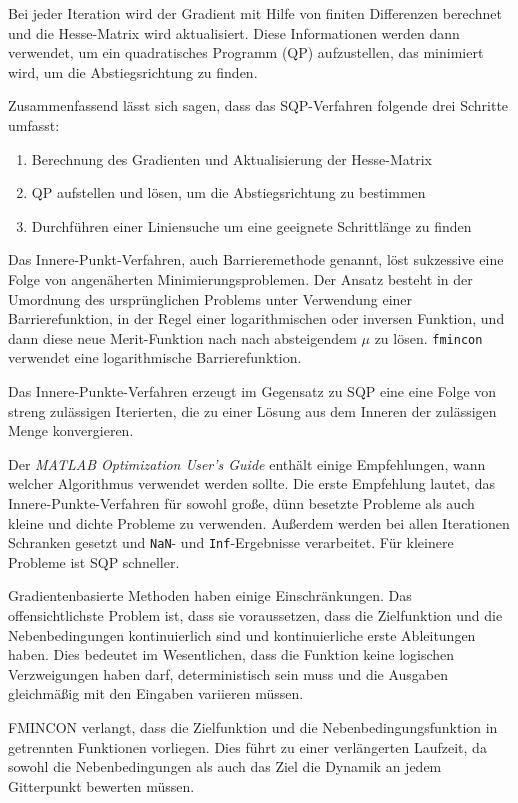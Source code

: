 Bei jeder Iteration wird der Gradient mit Hilfe von finiten Differenzen berechnet und die Hesse-Matrix wird aktualisiert. Diese Informationen werden dann verwendet, um ein quadratisches Programm (QP) aufzustellen, das minimiert wird, um die Abstiegsrichtung zu finden.

Zusammenfassend lässt sich sagen, dass das SQP-Verfahren folgende drei Schritte umfasst:
\begin{enumerate}
    \item Berechnung des Gradienten und Aktualisierung der Hesse-Matrix
    \item QP aufstellen und lösen, um die Abstiegsrichtung zu bestimmen
    \item Durchführen einer Liniensuche um eine geeignete Schrittlänge zu finden
\end{enumerate}

Das Innere-Punkt-Verfahren, auch Barrieremethode genannt, löst sukzessive eine Folge von angenäherten Minimierungsproblemen. Der Ansatz besteht in der Umordnung des ursprünglichen Problems unter Verwendung einer Barrierefunktion, in der Regel einer logarithmischen oder inversen Funktion, und dann diese neue Merit-Funktion nach nach absteigendem $\mu$ zu lösen. \texttt{fmincon} verwendet eine logarithmische Barrierefunktion.

Das Innere-Punkte-Verfahren erzeugt im Gegensatz zu SQP eine eine Folge von streng zulässigen Iterierten, die zu einer Lösung aus dem Inneren der zulässigen Menge konvergieren.

Der \textit{MATLAB Optimization User's Guide} enthält einige Empfehlungen, wann welcher Algorithmus verwendet werden sollte. Die erste Empfehlung lautet, das Innere-Punkte-Verfahren für sowohl große, dünn besetzte Probleme als auch kleine und dichte Probleme zu verwenden. Außerdem werden bei allen Iterationen Schranken gesetzt und \texttt{NaN}- und \texttt{Inf}-Ergebnisse verarbeitet. Für kleinere Probleme ist SQP schneller.

Gradientenbasierte Methoden haben einige Einschränkungen. Das offensichtlichste Problem ist, dass sie voraussetzen, dass die Zielfunktion und die Nebenbedingungen kontinuierlich sind und kontinuierliche erste Ableitungen haben. Dies bedeutet im Wesentlichen, dass die Funktion keine logischen Verzweigungen haben darf, deterministisch sein muss und die Ausgaben gleichmäßig mit den Eingaben variieren müssen. 

FMINCON verlangt, dass die Zielfunktion und die Nebenbedingungsfunktion in getrennten Funktionen vorliegen. Dies führt zu einer verlängerten Laufzeit, da sowohl die Nebenbedingungen als auch das Ziel die Dynamik an jedem Gitterpunkt bewerten müssen.

